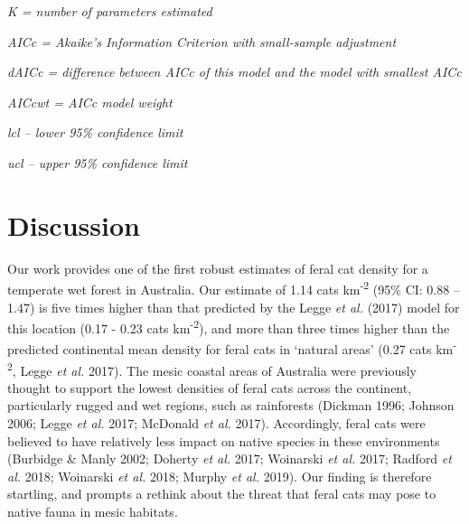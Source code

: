 \documentclass[11pt,a4paper,titlepage,twoside,openright]{style/unimelbthesis}
\begin{document}
\begin{mainmatter}
\emph{K = number of parameters estimated}

\emph{AICc = Akaike's Information Criterion with small-sample adjustment}

\emph{dAICc = difference between AICc of this model and the model with smallest AICc}

\emph{AICcwt = AICc model weight}

\emph{lcl -- lower 95\% confidence limit}

\emph{ucl -- upper 95\% confidence limit}

\newpage

\hypertarget{discussion}{%
\section{Discussion}\label{discussion}}

Our work provides one of the first robust estimates of feral cat density for a temperate wet forest in Australia. Our estimate of 1.14 cats km\textsuperscript{-2} (95\% CI: 0.88 -- 1.47) is five times higher than that predicted by the Legge \emph{et al.} (2017) model for this location (0.17 - 0.23 cats km\textsuperscript{-2}), and more than three times higher than the predicted continental mean density for feral cats in `natural areas' (0.27 cats km\textsuperscript{-2}, Legge \emph{et al.} 2017). The mesic coastal areas of Australia were previously thought to support the lowest densities of feral cats across the continent, particularly rugged and wet regions, such as rainforests (Dickman 1996; Johnson 2006; Legge \emph{et al.} 2017; McDonald \emph{et al.} 2017). Accordingly, feral cats were believed to have relatively less impact on native species in these environments (Burbidge \& Manly 2002; Doherty \emph{et al.} 2017; Woinarski \emph{et al.} 2017; Radford \emph{et al.} 2018; Woinarski \emph{et al.} 2018; Murphy \emph{et al.} 2019). Our finding is therefore startling, and prompts a rethink about the threat that feral cats may pose to native fauna in mesic habitats.


\end{mainmatter}
\end{document}
